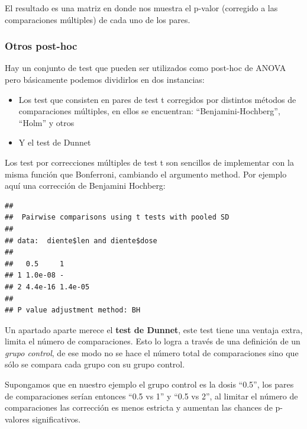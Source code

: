 \documentclass[
]{book}
\newenvironment{Shaded}{\begin{snugshade}}{\end{snugshade}}
\newcommand{\AttributeTok}[1]{\textcolor[rgb]{0.77,0.63,0.00}{#1}}
\newcommand{\FunctionTok}[1]{\textcolor[rgb]{0.00,0.00,0.00}{#1}}
\newcommand{\NormalTok}[1]{#1}
\newcommand{\SpecialCharTok}[1]{\textcolor[rgb]{0.00,0.00,0.00}{#1}}
\newcommand{\StringTok}[1]{\textcolor[rgb]{0.31,0.60,0.02}{#1}}
\begin{document}
El resultado es una matriz en donde nos muestra el p-valor (corregido a las comparaciones múltiples) de cada uno de los pares.

\hypertarget{otros-post-hoc}{%
\subsubsection{Otros post-hoc}\label{otros-post-hoc}}

Hay un conjunto de test que pueden ser utilizados como post-hoc de ANOVA pero básicamente podemos dividirlos en dos instancias:

\begin{itemize}
\item
  Los test que consisten en pares de test t corregidos por distintos métodos de comparaciones múltiples, en ellos se encuentran: ``Benjamini-Hochberg'', ``Holm'' y otros
\item
  Y el test de Dunnet
\end{itemize}

Los test por correcciones múltiples de test t son sencillos de implementar con la misma función que Bonferroni, cambiando el argumento method. Por ejemplo aquí una corrección de Benjamini Hochberg:

\begin{Shaded}
\end{Shaded}

\begin{verbatim}
## 
##  Pairwise comparisons using t tests with pooled SD 
## 
## data:  diente$len and diente$dose 
## 
##   0.5     1      
## 1 1.0e-08 -      
## 2 4.4e-16 1.4e-05
## 
## P value adjustment method: BH
\end{verbatim}

Un apartado aparte merece el \textbf{test de Dunnet}, este test tiene una ventaja extra, limita el número de comparaciones. Esto lo logra a través de una definición de un \emph{grupo control}, de ese modo no se hace el número total de comparaciones sino que sólo se compara cada grupo con su grupo control.

Supongamos que en nuestro ejemplo el grupo control es la dosis ``0.5'', los pares de comparaciones serían entonces ``0.5 vs 1'' y ``0.5 vs 2'', al limitar el número de comparaciones las corrección es menos estricta y aumentan las chances de p-valores significativos.
\end{document}
